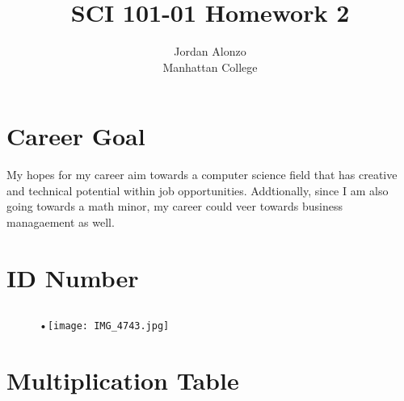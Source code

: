 \documentclass[11pt]{article}
\begin{document}
\title{SCI 101-01 Homework 2}
\author{Jordan Alonzo\\
Manhattan College}
\maketitle




\section {Career Goal}
My hopes for my career aim towards a computer science field that has creative and technical potential within job opportunities. Addtionally, since I am also going towards a math minor, my career could veer towards business managaement as well.

\section{ID Number}
\subsection{}
\begin{figure}[!h]
\begin{center}

•\texttt{[image: IMG\_4743.jpg]}
\end{center}
\end{figure}

\section {Multiplication Table}
\end{document}
